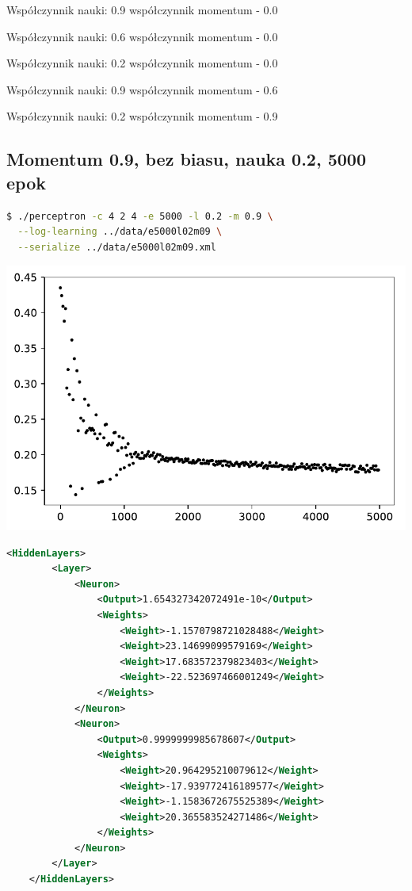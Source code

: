 \documentclass{classrep}
\begin{document}
Współczynnik nauki: 0.9 współczynnik momentum - 0.0

Współczynnik nauki: 0.6 współczynnik momentum - 0.0

Współczynnik nauki: 0.2 współczynnik momentum - 0.0

Współczynnik nauki: 0.9 współczynnik momentum - 0.6

Współczynnik nauki: 0.2 współczynnik momentum - 0.9

\clearpage
\subsection{Momentum 0.9, bez biasu, nauka 0.2, 5000 epok}
\begin{lstlisting}[language=bash]
$ ./perceptron -c 4 2 4 -e 5000 -l 0.2 -m 0.9 \
  --log-learning ../data/e5000l02m09 \
  --serialize ../data/e5000l02m09.xml
\end{lstlisting}

\begin{center}
 \includegraphics{sprawozdanie/output_0_9.pdf}
\end{center}

\begin{lstlisting}[language=xml]
    <HiddenLayers>
        <Layer>
            <Neuron>
                <Output>1.654327342072491e-10</Output>
                <Weights>
                    <Weight>-1.1570798721028488</Weight>
                    <Weight>23.14699099579169</Weight>
                    <Weight>17.683572379823403</Weight>
                    <Weight>-22.523697466001249</Weight>
                </Weights>
            </Neuron>
            <Neuron>
                <Output>0.9999999985678607</Output>
                <Weights>
                    <Weight>20.964295210079612</Weight>
                    <Weight>-17.939772416189577</Weight>
                    <Weight>-1.1583672675525389</Weight>
                    <Weight>20.365583524271486</Weight>
                </Weights>
            </Neuron>
        </Layer>
    </HiddenLayers>

\end{lstlisting}
\clearpage
\end{document}
